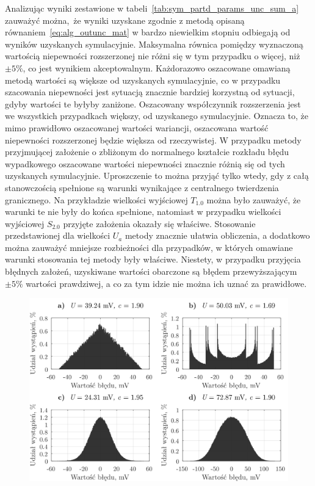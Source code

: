 Analizując wyniki zestawione w tabeli~\ref{tab:sym_partd_params_unc_sum_a} zauważyć można, że wyniki uzyskane zgodnie z metodą opisaną równaniem~\eqref{eq:alg_outunc_mat} w bardzo niewielkim stopniu odbiegają od wyników uzyskanych symulacyjnie. Maksymalna równica pomiędzy wyznaczoną wartością niepewności rozszerzonej nie różni się w tym przypadku o więcej, niż $\pm 5\%$, co jest wynikiem akceptowalnym. Każdorazowo oszacowane omawianą metodą wartości są większe od uzyskanych symulacyjnie, co w przypadku szacowania niepewności jest sytuacją znacznie bardziej korzystną od sytuacji, gdyby wartości te byłyby zaniżone. Oszacowany współczynnik rozszerzenia jest we wszystkich przypadkach większy, od uzyskanego symulacyjnie. Oznacza to, że mimo prawidłowo oszacowanej wartości wariancji, oszacowana wartość niepewności rozszerzonej będzie większa od rzeczywistej. W przypadku metody przyjmującej założenie o zbliżonym do normalnego kształcie rozkładu błędu wypadkowego oszacowane wartości niepewności znacznie różnią się od tych uzyskanych symulacyjnie. Uproszczenie to można przyjąć tylko wtedy, gdy z całą stanowczością spełnione są warunki wynikające z centralnego twierdzenia granicznego. Na przykładzie wielkości wyjściowej $T_{1.0}$ można było zauważyć, że warunki te nie były do końca spełnione, natomiast w przypadku wielkości wyjściowej $S_{2.0}$ przyjęte założenia okazały się właściwe. Stosowanie przedstawionej dla wielkości $U_{a}$ metody znacznie ułatwia obliczenia, a dodatkowo można zauważyć mniejsze rozbieżności dla przypadków, w których omawiane warunki stosowania tej metody były właściwe. Niestety, w przypadku przyjęcia błędnych założeń, uzyskiwane wartości obarczone są błędem przewyższającym $\pm 5\%$ wartości prawdziwej, a co za tym idzie nie można ich uznać za prawidłowe.

\begin{figure}[htb!]
\begin{center}
\includegraphics{obrazki/hist_part_S}
\end{center}
\end{figure}

